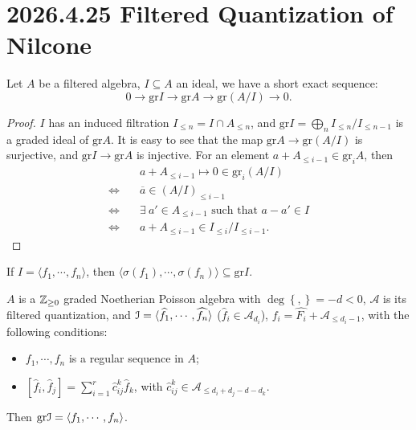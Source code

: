 \documentclass[12pt]{amsart}
\numberwithin{equation}{section}
\newcommand{\CA}{{\mathcal {A}}} \newcommand{\CB}{{\mathcal {B}}} \newcommand{\CC}{{\mathcal {C}}}
\newcommand{\gr}{{\mathrm{gr}}}   \newcommand{\Sym}{{\mathrm{Sym}}}
\newcommand{\sqbra}[1]{\left[#1\right]}
\newcommand{\Bra}[1]{\left\{#1\right\}}
\renewcommand{\bar}{\overline}
\renewcommand{\hat}{\widehat}
\begin{document}
\section{2026.4.25 Filtered Quantization of Nilcone}

\cite{Losev2022Topics}

\begin{lem}
  Let $A$ be a filtered algebra, $I \subseteq A$ an ideal, we have a short exact sequence:
  \[
    0 \to \gr I \to \gr A \to \gr (A/I) \to 0.
  \]
\end{lem}

\begin{proof}
  $I$ has an induced filtration $I_{\leq n} = I \cap A_{\leq n}$, and $\gr I = \bigoplus_{n} I_{\leq n}/I_{\leq n-1}$ is a graded ideal of $\gr A$. It is easy to see that the map $\gr A \to \gr (A/I)$ is surjective, and $\gr I \to \gr A$ is injective. For an element $a + A_{\leq i-1} \in \gr_{i} A$, then
  \begin{align*}
    &a + A_{\leq i-1} \mapsto 0 \in \gr_{i}(A/I) \\
    \Leftrightarrow \quad  &\bar{a} \in (A/I)_{\leq i-1} \\
    \Leftrightarrow \quad  &\exists \ a' \in A_{\leq i-1} \text{ such that } a - a' \in I \\
    \Leftrightarrow \quad  &a + A_{\leq i-1} \in I_{\leq i}/I_{\leq i-1}.
  \end{align*}
\end{proof}

\begin{rk}
  If $I = \langle f_1, \cdots , f_n\rangle$, then $\langle\sigma(f_1),\cdots,\sigma(f_n)\rangle \subseteq \gr I$.
\end{rk}  

\begin{prop}
  $A$ is a ${\mathbb {Z}}_{\geq0}$ graded Noetherian Poisson algebra with $\deg \Bra{,} = -d < 0$, $\CA$ is its filtered quantization, and $\CI = \langle \hat{f_1}, \cdots, \hat{f_n}  \rangle$ ($\hat{f}_i \in \CA_{d_i}$), $f_i = \hat{F_i} + \CA_{\leq d_i -1}$, with the following conditions:
\begin{itemize} 
  \item $f_1, \cdots, f_n$ is a regular sequence in $A$;
  \item $\sqbra{\hat{f}_i, \hat{f}_j} = \sum_{i = 1}^{r} \hat{c}_{ij}^k \hat{f}_k$, with $\hat{c}_{ij}^k  \in \CA_{\leq d_i + d_j -d -d_k}$.
\end{itemize}
Then $\gr \CI = \langle f_1, \cdots, f_n\rangle$.
\end{prop}
  
\end{document}

